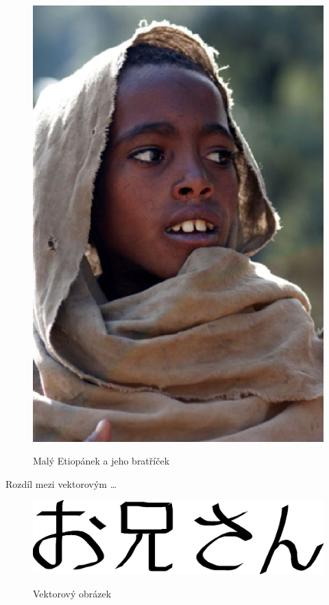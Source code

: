 \documentclass[a4paper, 11pt]{article}
\begin{document}
\begin{figure}[h]
{{        \includegraphics{etiopan.eps}
        }
    }
    \caption{Malý Etiopánek a jeho bratříček}
    \label{fig:Etiopanek}
\end{figure}
\pagebreak

\noindent Rozdíl mezi vektorovým \dots

\begin{figure}[h]
    \centering
    \scalebox{0.4}
    {
        \includegraphics{oniisan.eps}
    }
    \caption{Vektorový obrázek}
    \label{fig:vektorovy}
\end{figure}
\end{document}
